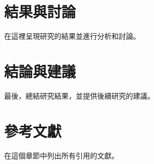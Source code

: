 \documentclass[12pt,a4paper]{report}
\begin{document}
\chapter*{結果與討論} %
\vspace{-1cm} %
在這裡呈現研究的結果並進行分析和討論。

\chapter*{結論與建議} %
\vspace{-1cm} %
最後，總結研究結果，並提供後續研究的建議。

\chapter*{參考文獻} %
\vspace{-1cm} %
在這個章節中列出所有引用的文獻。
\end{document}
